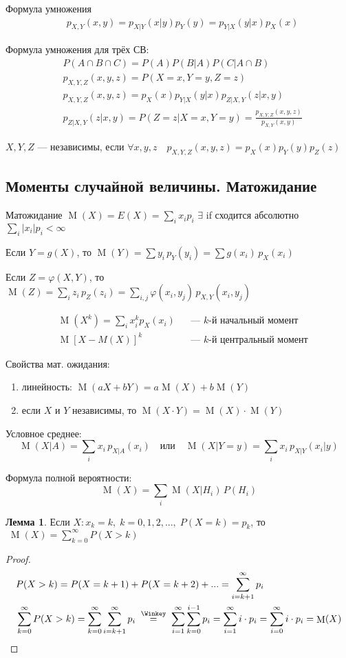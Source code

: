 \documentclass[a4paper,12pt,fleqn]{article}
\numberwithin{figure}{section}
\theoremstyle{definition}
\newtheorem{lemma}{Лемма}[section]
\let\phi\varphi
\def\on{\!:}
\DeclareMathOperator{\M}{M}
\begin{document}
Формула умножения
\begin{align*}
&	p_{X,Y}(x,y) = p_{X|Y}(x|y) p_Y(y) = p_{Y|X}(y|x) p_X(x)
\end{align*}

Формула умножения для трёх СВ:
\begin{align*}
&	P(A \cap B \cap C) = P(A) P(B|A) P(C|A \cap B) \\
&	p_{X,Y,Z}(x,y,z) = P(X=x, Y=y, Z=z) \\
&	p_{X,Y,Z}(x,y,z) = p_X(x) p_{Y|X}(y|x) p_{Z|X,Y}(z|x,y) \\
&	p_{Z|X,Y}(z|x,y) = P(Z=z|X=x,Y=y) = \frac{p_{X,Y,Z}(x,y,z)}{p_{X,Y}(x,y)}
\end{align*}

$X,Y,Z$ --- независимы, если $\forall x,y,z \quad p_{X,Y,Z}(x,y,z) = p_X(x)p_Y(y)p_Z(z)$


\subsection{Моменты случайной величины. Матожидание}

Матожидание $\M(X) = E(X) = \sum_i x_i p_i$
\quad $\exists$ if сходится абсолютно $\sum_i |x_i|p_i < \infty$

Если $Y=g(X)$,
то $\M(Y)=\sum y_i \, p_Y(y_i) = \sum g(x_i) \, p_X(x_i)$

Если $Z=\phi(X,Y)$,
то $\M(Z) = \sum_i z_i \, p_Z(z_i) = \sum_{i,j} \phi(x_i,y_j) \, p_{X,Y}(x_i,y_j)$

\begin{align*}
&	\M(X^k) = \sum_i x_i^k p_X(x_i) &&\text{--- $k$-й начальный момент} \\
&	\M[X-M(X)]^k 	&&\text{--- $k$-й центральный момент}
\end{align*}

Свойства мат. ожидания:
\begin{enumerate}
	\item линейность: $\M(aX+bY) = a\M(X)+b\M(Y)$
	\item если $X$ и $Y$ независимы, то $\M(X\cdot Y) = \M(X)\cdot \M(Y)$
\end{enumerate}

Условное среднее:
\[	\M(X|A) = \sum_i x_i \, p_{X|A}(x_i)
	\quad\text{или}\quad
	\M(X|Y=y) = \sum_i x_i \, p_{X|Y}(x_i|y) \]

Формула полной вероятности:
\[ \M(X) = \sum_i \M(X|H_i) \, P(H_i)  \]


\begin{lemma}
	Если $X\on x_k=k ,\; k=0,1,2,... ,\; P(X=k)=p_k$,
	то $\; \M(X)=\sum_{k=0}^{\infty}P(X>k)$
\end{lemma}
\begin{proof}
\begin{align*}
&	P(X>k) = P(X=k+1) + P(X=k+2) + ... = \sum_{i=k+1}^{\infty}p_i \\
&	\sum_{k=0}^{\infty}P(X>k) =
	\sum_{k=0}^{\infty} \sum_{i=k+1}^{\infty}p_i
	\; \overset{\Winkey}{=} \;
	\sum_{i=1}^{\infty} \sum_{k=0}^{i-1} p_i =
	\sum_{i=1}^{\infty} i \cdot p_i =
	\sum_{i=0}^{\infty} i \cdot p_i = \M(X)
\end{align*}
\end{proof}
\end{document}
